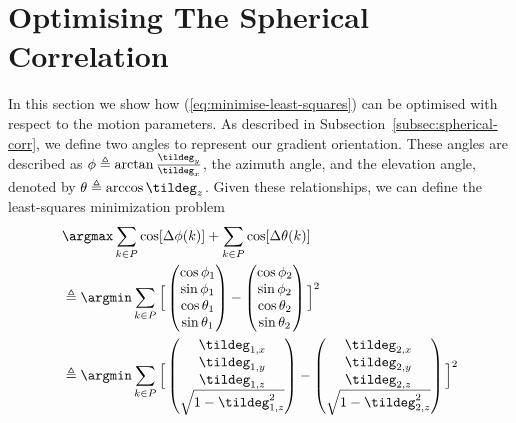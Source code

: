 \section{Optimising The Spherical Correlation}\label{sec:spherical}
In this section we show how (\ref{eq:minimise-least-squares}) can be optimised with respect to the motion parameters. As described in Subsection~\ref{subsec:spherical-corr}, we define two angles to represent our gradient orientation. These angles are described as  $\phi \triangleq \arctan \frac{\tildeg_y}{\tildeg_x}$, the azimuth angle, and the elevation angle, denoted by $\theta \triangleq \arccos \tildeg_z$. Given these relationships, we can define the least-squares minimization problem
\begin{equation}
  \begin{aligned}\label{eq:ang-least-squares}
    &  \argmax \sum_{k \in P} \cos [\Delta \phi (k)] + \sum_{k \in P} \cos [\Delta \theta (k)] \\
    &\triangleq \argmin \sum_{k \in P} \Big[ 
        \begin{pmatrix}
            \cos{\phi_1} \\
            \sin{\phi_1} \\
            \cos{\theta_1} \\
            \sin{\theta_1}
        \end{pmatrix}
        -
        \begin{pmatrix}
            \cos{\phi_2} \\
            \sin{\phi_2} \\
            \cos{\theta_2} \\
            \sin{\theta_2}
        \end{pmatrix}
        \Big] ^2 \\
    &\triangleq \argmin \sum_{k \in P} \Big[ 
        \begin{pmatrix}
            \tildeg_{1,x} \\ 
            \tildeg_{1,y} \\ 
            \tildeg_{1,z} \\ 
            \sqrt{1 - \tildeg_{1,z}^2}
        \end{pmatrix}
        -
        \begin{pmatrix}
            \tildeg_{2,x} \\ 
            \tildeg_{2,y} \\ 
            \tildeg_{2,z} \\ 
            \sqrt{1 - \tildeg_{2,z}^2}
        \end{pmatrix}
        \Big] ^2
    \end{aligned}
\end{equation}
